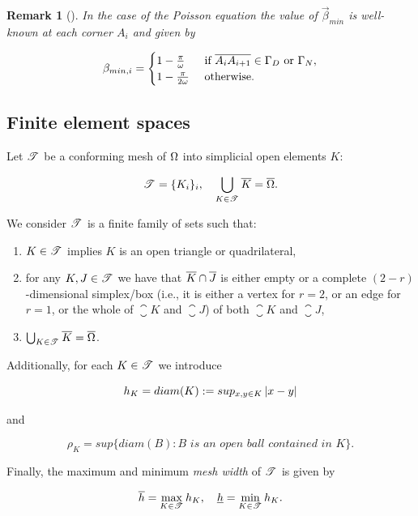 \documentclass[a4paper,11pt]{article}
\newtheorem{remark}[theorem]{Remark}
\begin{document}
{\begin{remark}[{\cite[Theorem 2.1 - Remark 3]{BG:1988}}]
\label{remark:beta_value}
In the case of the Poisson equation the value of $\vec{\beta}_{min}$ is well-known at each corner $A_{i}$ and given by

\begin{equation}
    \beta_{min,i} = 
    \begin{cases}
        1 - \frac{\pi}{\omega} & \text{ if }  \overline{A_{i}A_{i+1}} \in \Gamma_{D} \text{ or }  \Gamma_{N},\\
        1 - \frac{\pi}{2\omega} & \text{ otherwise}.
    \end{cases}
\end{equation}
\end{remark}

\subsection{Finite element spaces}

Let $\mathscr T^{}$ be a conforming mesh of $\Omega$ into simplicial open elements $K$:

$$ \mathscr T^{} = \{K_{i}\}_{i}, \quad \bigcup_{K \in \mathscr T^{}} \overline{K} = \overline{\Omega}.$$

We consider $\mathscr T^{}$ is a finite family of sets such
that:
\begin{enumerate}
\item $K\in\mathscr T^{}$ implies $K$ is an open triangle or quadrilateral,
\item for any $K,J\in\mathscr T^{}$ we have that $\overline{K}\cap\overline{J}$ is either empty or
  a complete $(2-r)$-dimensional simplex/box (i.e., it is either a vertex for $r=2$, or an
  edge for $r=1$, or the whole of $\closure K$ and $\closure J$) of both
  $\closure K$ and $\closure J$,
\item $\bigcup_{K\in\mathscr T^{}}\overline{K}=\overline{\Omega}$.
\end{enumerate}

Additionally, for each $K \in \mathscr T^{}$ we introduce 

$$h_{K} = diam(K) := sup_{x,y \in K} \left|x - y\right| $$

and 

$$\rho_{K} = sup\{diam(B) : B \textit{ is an open ball contained in } K\}. $$

Finally, the maximum and minimum \textit{mesh width} of $\mathscr T^{}$ is given by

$$\overline{h} = \max_{K \in \mathscr T^{}} h_{K}, \quad \underline{h} = \min_{K \in \mathscr T^{}} h_{K}.$$

}
\end{document}
